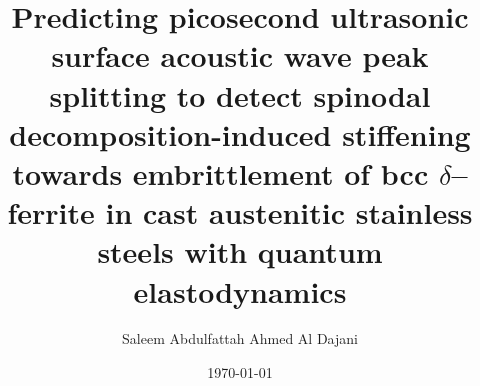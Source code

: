 \documentclass[final,3p,times]{elsarticle}
\begin{document}
\begin{frontmatter}


\title
{
\textbf
{
Predicting picosecond ultrasonic surface acoustic wave peak splitting to detect spinodal decomposition-induced stiffening towards embrittlement of bcc $\delta$--ferrite in cast austenitic stainless steels with quantum elastodynamics 
}
}
\date
{\today}
\rhead{\today}



\author[1]{Saleem Abdulfattah Ahmed Al Dajani}


\address{
Department of Nuclear Science and Engineering \\
Massachusetts Institute of Technology\\
77 Massachusetts Avenue \\
Cambridge, MA 02139}

\address[1]
{
Corresponding Author: \href{mailto:sdajani@mit.edu}{\texttt{sdajani@mit.edu}}
}
\begin{abstract}

\end{abstract}


\end{frontmatter}
\end{document}
